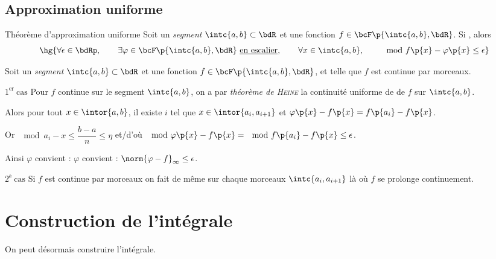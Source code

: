 \documentclass[a4paper,french,bookmarks]{article}
\begin{document}
    \subsection{Approximation uniforme}
    
    \begin{theorem}{Théorème d'approximation uniforme}{}
        Soit un \textit{segment} $\intc{a, b} \subset \bdR$ et une fonction $f \in \bcF\p{\intc{a, b}, \bdR}$. Si , alors
        \[ \hg{ \forall \epsilon \in \bdRp,\qquad \exists \varphi \in \bcF\p{\intc{a, b}, \bdR} \ \text{\underline{en escalier}},\qquad \forall x \in \intc{a, b},\qquad \mod{f\p{x} - \varphi\p{x}} \leq \epsilon}\]
    \end{theorem}
    \begin{nproof}
        Soit un \textit{segment} $\intc{a, b} \subset \bdR$ et une fonction $f \in \bcF\p{\intc{a, b}, \bdR}$, et telle que $f$ est continue par morceaux.
        
        \begin{enumerate}
            \itt $\boxed{1^\text{er} \ \text{cas}}$ Pour $f$ continue sur le segment $\intc{a, b}$, on a par \textit{théorème de \textsc{Heine}} la continuité uniforme de de $f$ sur $\intc{a, b}$.
            
            Alors pour tout $x \in \intor{a, b}$, il existe $i$ tel que $x \in \intor{a_i, a_{i+1}}$ et $\varphi\p{x} - f\p{x} = f\p{a_i} - f\p{x}$.
            
            Or $\mod{a_i - x} \leq \dfrac{b-a}{n} \leq \eta$ et/d'où $\mod{\varphi\p{x} - f\p{x}} = \mod{f\p{a_i} - f\p{x}} \leq \epsilon$.
            
            Ainsi $\varphi$ convient : $\varphi$ convient : \qquad $\norm{\varphi - f}_{\infty} \leq \epsilon$.
            
             \itt $\boxed{2^\text{è} \ \text{cas}}$ Si $f$ est continue par morceaux on fait de même sur chaque morceaux $\intc{a_i, a_{i+1}}$ là où $f$ se prolonge continuement.
        \end{enumerate}
    \end{nproof}
    
    \section{Construction de l'intégrale}
    
    On peut désormais construire l'intégrale.
    
\end{document}
